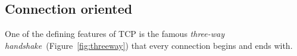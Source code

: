 \documentclass[11pt,a4paper,british]{bhamarticle}
\begin{document}
\begin{multicols}{2}

\subsection{Connection oriented}
One of the defining features of TCP is the famous \textit{three-way handshake}~(Figure~\ref{fig:threeway}) that every connection begins and ends with.


\end{multicols}
\end{document}
